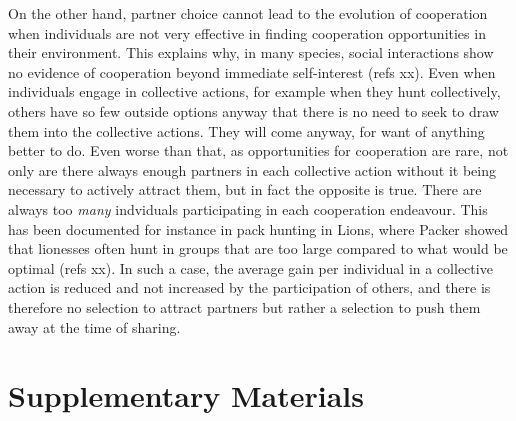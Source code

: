 \documentclass[twocolumn]{article}
\begin{document}
On the other hand, partner choice cannot lead to the evolution of cooperation when individuals are not very effective in finding cooperation opportunities in their environment. This explains why, in many species, social interactions show no evidence of cooperation beyond immediate self-interest (refs xx). Even when individuals engage in collective actions, for example when they hunt collectively, others have so few outside options anyway that there is no need to seek to draw them into the collective actions. They will come anyway, for want of anything better to do. Even worse than that, as opportunities for cooperation are rare, not only are there always enough partners in each collective action without it being necessary to actively attract them, but in fact the opposite is true. There are always too \textit{many} indviduals participating in each cooperation endeavour. This has been documented for instance in pack hunting in Lions, where Packer showed that lionesses often hunt in groups that are too large compared to what would be optimal (refs xx). In such a case, the average gain per individual in a collective action is reduced and not increased by the participation of others, and there is therefore no selection to attract partners but rather a selection to push them away at the time of sharing.




\footnotesize{
}

\clearpage

\section*{Supplementary Materials}
\end{document}
